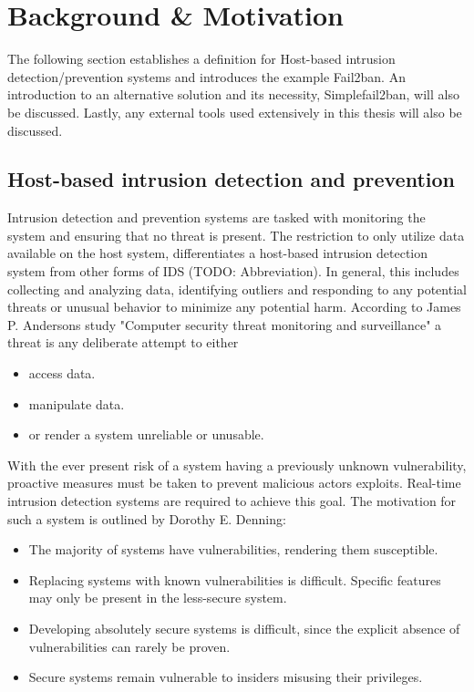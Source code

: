 %
%

\chapter{Background \& Motivation}
\label{cha:background}
The following section establishes a definition for Host-based intrusion detection/prevention systems and introduces the example Fail2ban.
An introduction to an alternative solution and its necessity, Simplefail2ban, will also be discussed.
Lastly, any external tools used extensively in this thesis will also be discussed. 

\section{Host-based intrusion detection and prevention}
Intrusion detection and prevention systems are tasked with monitoring the system and ensuring that no threat is present.
The restriction to only utilize data available on the host system, differentiates a host-based intrusion detection system from other forms of IDS (TODO: Abbreviation).
In general, this includes collecting and analyzing data, identifying outliers and responding to any potential threats or unusual behavior to minimize any potential harm.
According to James P. Andersons study "Computer security threat monitoring and surveillance"\cite{anderson:compSec} a threat is any deliberate attempt to either
\begin{itemize}
    \itemsep0em
    \item access data.
    \item manipulate data.
    \item or render a system unreliable or unusable.
\end{itemize}

With the ever present risk of a system having a previously unknown vulnerability, proactive measures must be taken to prevent malicious actors exploits.
Real-time intrusion detection systems are required to achieve this goal.
The motivation for such a system is outlined by Dorothy E. Denning\cite{denning:IntrusionModel}:
\begin{itemize}
    \itemsep0em
    \item The majority of systems have vulnerabilities, rendering them susceptible. 
    \item Replacing systems with known vulnerabilities is difficult. Specific features may only be present in the less-secure system.
    \item Developing absolutely secure systems is difficult, since the explicit absence of vulnerabilities can rarely be proven.
    \item Secure systems remain vulnerable to insiders misusing their privileges.
\end{itemize}

